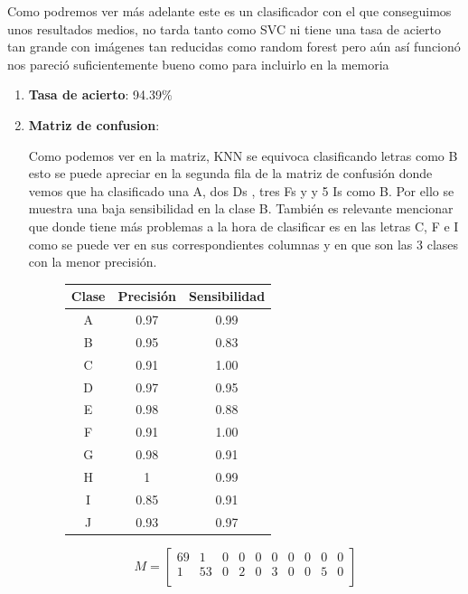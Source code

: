 \documentclass[8pt,a4paper]{article}
\begin{document}
Como podremos ver más adelante este es un clasificador con el que conseguimos unos resultados medios, no tarda tanto como SVC ni tiene una tasa de acierto tan grande con imágenes tan reducidas como random forest pero aún así funcionó nos pareció suficientemente bueno como para incluirlo en la memoria
\begin{enumerate}
\item \textbf{Tasa de acierto}: 94.39$\%$
\newpage
\item \textbf{Matriz de confusion}:
	
Como podemos ver en la matriz, KNN se equivoca clasificando letras como B esto se puede apreciar en la segunda fila de la matriz de confusión donde vemos que ha clasificado una A, dos Ds , tres Fs y y 5 Is como B. Por ello se muestra una baja sensibilidad en la clase B. También es relevante mencionar que donde tiene más problemas a la hora de clasificar es en las letras C, F e I como se puede ver en sus correspondientes columnas y en que son las 3 clases con la menor precisión.
\begin{figure}[h!]
\centering
\begin{minipage}{.5\textwidth}
    \begin{tabular}{|c|c|c|} %
    \hline
      \textbf{Clase} & \textbf{Precisión} & \textbf{Sensibilidad}\\
      \hline
      A & 0.97 & 0.99\\
      \hline
      B & 0.95 & 0.83\\
      \hline
      C & 0.91 & 1.00\\
      \hline
      D & 0.97 & 0.95\\
      \hline
      E & 0.98 & 0.88\\
      \hline
      F & 0.91 & 1.00\\
      \hline
      G & 0.98 & 0.91\\
      \hline
      H & 1    & 0.99\\
      \hline
      I & 0.85 & 0.91\\
      \hline
      J & 0.93 & 0.97\\
      \hline
    \end{tabular}
\end{minipage}%
\begin{minipage}{.5\textwidth}
\[
M=
  \begin{bmatrix}
    69 & 1 & 0 & 0 & 0 & 0 & 0 & 0 & 0 & 0 \\
    1 & 53 & 0 & 2 & 0 & 3 & 0 & 0 & 5 & 0 \\

\end{bmatrix}\]
\end{minipage}
\end{figure}
\end{enumerate}
\end{document}
